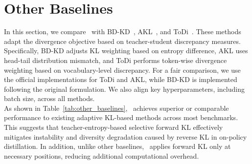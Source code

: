 \section{Other Baselines}
\label{app:other_baselines}
In this section, we compare \method~with BD-KD~\cite{amara2022bd}, AKL~\cite{wu2025rethinking}, and ToDi~\cite{jung2025todi}. These methods adapt the divergence objective based on teacher-student discrepancy measures. Specifically, BD-KD adjusts KL weighting based on entropy difference, AKL uses head-tail distribution mismatch, and ToDi performs token-wise divergence weighting based on vocabulary-level discrepancy.
For a fair comparison, we use the official implementations for ToDi and AKL, while BD-KD is implemented following the original formulation. We also align key hyperparameters, including batch size, across all methods.\\
As shown in Table~\ref{tab:other_baselines}, \method~achieves superior or comparable performance to existing adaptive KL-based methods across most benchmarks. This suggests that teacher-entropy-based selective forward KL effectively mitigates instability and diversity degradation caused by reverse KL in on-policy distillation. In addition, unlike other baselines, \method~applies forward KL only at necessary positions, reducing additional computational overhead.

\begin{table}[ht]
\centering
\caption{
Comparison with adaptive KL-based baselines. \textbf{Bold} indicates the best performance and \underline{underline} indicates the second-best performance.}
\label{tab:other_baselines}
\end{table}